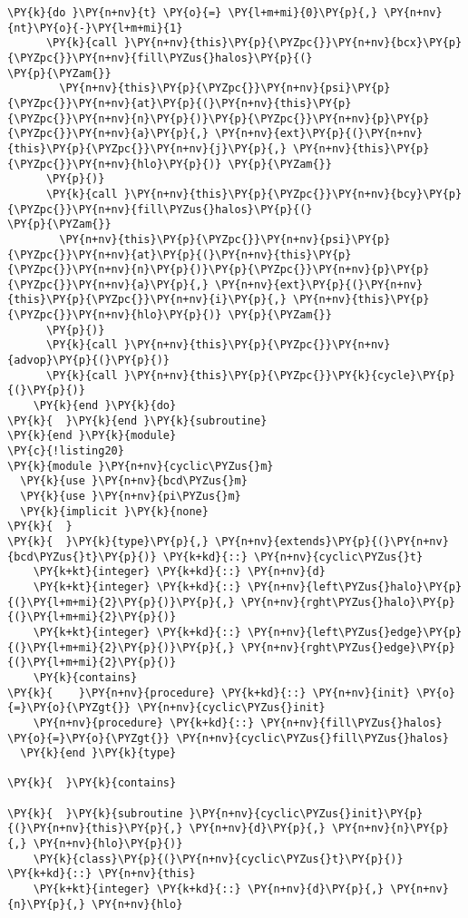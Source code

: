 \begin{Verbatim}[commandchars=\\\{\}]
    \PY{k}{do }\PY{n+nv}{t} \PY{o}{=} \PY{l+m+mi}{0}\PY{p}{,} \PY{n+nv}{nt}\PY{o}{-}\PY{l+m+mi}{1} 
      \PY{k}{call }\PY{n+nv}{this}\PY{p}{\PYZpc{}}\PY{n+nv}{bcx}\PY{p}{\PYZpc{}}\PY{n+nv}{fill\PYZus{}halos}\PY{p}{(}                        \PY{p}{\PYZam{}}
        \PY{n+nv}{this}\PY{p}{\PYZpc{}}\PY{n+nv}{psi}\PY{p}{\PYZpc{}}\PY{n+nv}{at}\PY{p}{(}\PY{n+nv}{this}\PY{p}{\PYZpc{}}\PY{n+nv}{n}\PY{p}{)}\PY{p}{\PYZpc{}}\PY{n+nv}{p}\PY{p}{\PYZpc{}}\PY{n+nv}{a}\PY{p}{,} \PY{n+nv}{ext}\PY{p}{(}\PY{n+nv}{this}\PY{p}{\PYZpc{}}\PY{n+nv}{j}\PY{p}{,} \PY{n+nv}{this}\PY{p}{\PYZpc{}}\PY{n+nv}{hlo}\PY{p}{)} \PY{p}{\PYZam{}}
      \PY{p}{)}
      \PY{k}{call }\PY{n+nv}{this}\PY{p}{\PYZpc{}}\PY{n+nv}{bcy}\PY{p}{\PYZpc{}}\PY{n+nv}{fill\PYZus{}halos}\PY{p}{(}                        \PY{p}{\PYZam{}}
        \PY{n+nv}{this}\PY{p}{\PYZpc{}}\PY{n+nv}{psi}\PY{p}{\PYZpc{}}\PY{n+nv}{at}\PY{p}{(}\PY{n+nv}{this}\PY{p}{\PYZpc{}}\PY{n+nv}{n}\PY{p}{)}\PY{p}{\PYZpc{}}\PY{n+nv}{p}\PY{p}{\PYZpc{}}\PY{n+nv}{a}\PY{p}{,} \PY{n+nv}{ext}\PY{p}{(}\PY{n+nv}{this}\PY{p}{\PYZpc{}}\PY{n+nv}{i}\PY{p}{,} \PY{n+nv}{this}\PY{p}{\PYZpc{}}\PY{n+nv}{hlo}\PY{p}{)} \PY{p}{\PYZam{}}
      \PY{p}{)}
      \PY{k}{call }\PY{n+nv}{this}\PY{p}{\PYZpc{}}\PY{n+nv}{advop}\PY{p}{(}\PY{p}{)}
      \PY{k}{call }\PY{n+nv}{this}\PY{p}{\PYZpc{}}\PY{k}{cycle}\PY{p}{(}\PY{p}{)}
    \PY{k}{end }\PY{k}{do}
\PY{k}{  }\PY{k}{end }\PY{k}{subroutine}
\PY{k}{end }\PY{k}{module}
\PY{c}{!listing20}
\PY{k}{module }\PY{n+nv}{cyclic\PYZus{}m}
  \PY{k}{use }\PY{n+nv}{bcd\PYZus{}m}
  \PY{k}{use }\PY{n+nv}{pi\PYZus{}m}
  \PY{k}{implicit }\PY{k}{none}
\PY{k}{  }
\PY{k}{  }\PY{k}{type}\PY{p}{,} \PY{n+nv}{extends}\PY{p}{(}\PY{n+nv}{bcd\PYZus{}t}\PY{p}{)} \PY{k+kd}{::} \PY{n+nv}{cyclic\PYZus{}t}
    \PY{k+kt}{integer} \PY{k+kd}{::} \PY{n+nv}{d}
    \PY{k+kt}{integer} \PY{k+kd}{::} \PY{n+nv}{left\PYZus{}halo}\PY{p}{(}\PY{l+m+mi}{2}\PY{p}{)}\PY{p}{,} \PY{n+nv}{rght\PYZus{}halo}\PY{p}{(}\PY{l+m+mi}{2}\PY{p}{)} 
    \PY{k+kt}{integer} \PY{k+kd}{::} \PY{n+nv}{left\PYZus{}edge}\PY{p}{(}\PY{l+m+mi}{2}\PY{p}{)}\PY{p}{,} \PY{n+nv}{rght\PYZus{}edge}\PY{p}{(}\PY{l+m+mi}{2}\PY{p}{)} 
    \PY{k}{contains}
\PY{k}{    }\PY{n+nv}{procedure} \PY{k+kd}{::} \PY{n+nv}{init} \PY{o}{=}\PY{o}{\PYZgt{}} \PY{n+nv}{cyclic\PYZus{}init}
    \PY{n+nv}{procedure} \PY{k+kd}{::} \PY{n+nv}{fill\PYZus{}halos} \PY{o}{=}\PY{o}{\PYZgt{}} \PY{n+nv}{cyclic\PYZus{}fill\PYZus{}halos}
  \PY{k}{end }\PY{k}{type}

\PY{k}{  }\PY{k}{contains}

\PY{k}{  }\PY{k}{subroutine }\PY{n+nv}{cyclic\PYZus{}init}\PY{p}{(}\PY{n+nv}{this}\PY{p}{,} \PY{n+nv}{d}\PY{p}{,} \PY{n+nv}{n}\PY{p}{,} \PY{n+nv}{hlo}\PY{p}{)}
    \PY{k}{class}\PY{p}{(}\PY{n+nv}{cyclic\PYZus{}t}\PY{p}{)} \PY{k+kd}{::} \PY{n+nv}{this}
    \PY{k+kt}{integer} \PY{k+kd}{::} \PY{n+nv}{d}\PY{p}{,} \PY{n+nv}{n}\PY{p}{,} \PY{n+nv}{hlo}


\end{Verbatim}
